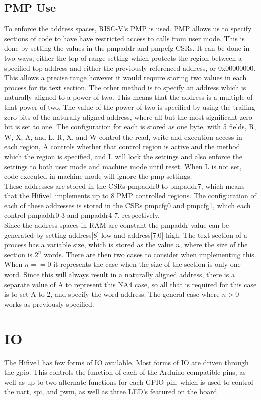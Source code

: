 \subsection{PMP Use}
To enforce the address spaces, RISC-V's PMP is used. PMP allows us to specify sections of code to have have restricted access to calls from user mode. This is done by setting the values in the pmpaddr and pmpcfg CSRs. It can be done in two ways, either the top of range setting which protects the region between a specified top address and either the previously referenced address, or 0x00000000. This allows a precise range however it would require storing two values in each process for its text section. The other method is to specify an address which is naturally aligned to a power of two. This means that the address is a multiple of that power of two. The value of the power of two is specified by using the trailing zero bits of the naturally aligned address, where all but the most significant zero bit is set to one. The configuration for each is stored as one byte, with 5 fields, R, W, X, A, and L. R, X, and W control the read, write and execution access in each region, A controls whether that control region is active and the method which the region is specified, and L will lock the settings and also enforce the settings to both user mode and machine mode until reset. When L is not set, code executed in machine mode will ignore the \ac{pmp} settings.\\
These addresses are stored in the CSRs pmpaddr0 to pmpaddr7, which means that the Hifive1 implements up to 8 PMP controlled regions. The configuration of each of these addresses is stored in the CSRs pmpcfg0 and pmpcfg1, which each control pmpaddr0-3 and pmpaddr4-7, respectively.\\

Since the address spaces in RAM are constant the pmpaddr value can be generated by setting address[8] low and address[7:0] high. The text section of a process has a variable size, which is stored as the value \(n\), where the size of the section is \(2^n\) words. There are then two cases to consider when implementing this. When \(n == 0\) it represents the case when the size of the section is only one word. Since this will always result in a naturally aligned address, there is a separate value of A to represent this NA4 case, so all that is required for this case is to set A to 2, and specify the word address. The general case where \(n > 0\) works as previously specified. 
\section{IO}
The Hifive1 has few forms of IO available. Most forms of IO are driven through the \ac{gpio}. This controls the function of each of the Arduino-compatible pins, as well as up to two alternate functions for each GPIO pin, which is used to control the \ac{uart}, \ac{spi}, and \ac{pwm}, as well as three LED's featured on the board. 
